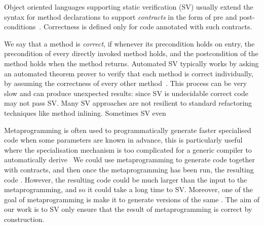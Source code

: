 \noindent Object oriented languages supporting static verification (SV) usually extend the syntax for method declarations
to support \emph{contracts} in the form of pre and post-conditions~\cite{Meyer:1988:OSC:534929}.
Correctness is defined only for code annotated with such contracts.

We say that a method is \emph{correct}, if whenever its precondition holds on entry, the precondition of every directly invoked method holds, and the postcondition of the method holds when the method returns. Automated SV typically works by asking an automated theorem prover to verify that each method is correct individually, by assuming the correctness of every other method~\cite{barnett2004spec}. This process can be very slow and can produce unexpected results: since SV is undecidable correct code may not pass SV.
Many SV approaches are not resilient to
 standard refactoring techniques like 
method inlining. Sometimes SV even  

Metaprogramming is often used to programmatically generate faster specialised code when some parameters are known in advance, this is particularly useful where the specialisation mechanism is too complicated for a generic compiler to automatically derive~\cite{Ofenbeck:2017:SGP:3136040.3136060}
We could use metaprogramming to generate code together with contracts, and then once the metaprogramming has been run,
   the resulting code . 
However, the resulting code could be much larger than the input to the metaprogramming, and so it could take a long time to SV.
Moreover, one of the   goal of metaprogramming is  make it   to generate   versions of the same  . 
The aim of our work is to  SV only  
 ensure that the result of metaprogramming is  correct by construction.

